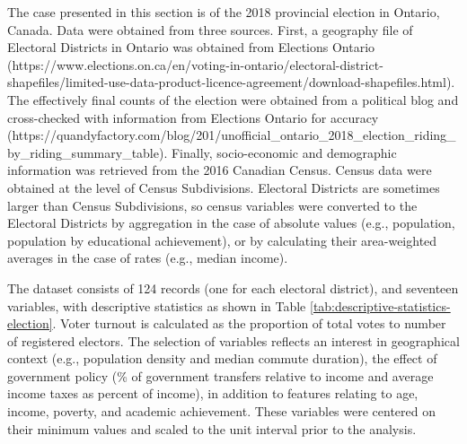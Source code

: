 \documentclass[]{elsarticle} %
\begin{document}
The case presented in this section is of the 2018 provincial election in
Ontario, Canada. Data were obtained from three sources. First, a
geography file of Electoral Districts in Ontario was obtained from
Elections Ontario
(https://www.elections.on.ca/en/voting-in-ontario/electoral-district-shapefiles/limited-use-data-product-licence-agreement/download-shapefiles.html).
The effectively final counts of the election were obtained from a
political blog and cross-checked with information from Elections Ontario
for accuracy
(https://quandyfactory.com/blog/201/unofficial\_ontario\_2018\_election\_riding\_by\_riding\_summary\_table).
Finally, socio-economic and demographic information was retrieved from
the 2016 Canadian Census. Census data were obtained at the level of
Census Subdivisions. Electoral Districts are sometimes larger than
Census Subdivisions, so census variables were converted to the Electoral
Districts by aggregation in the case of absolute values (e.g.,
population, population by educational achievement), or by calculating
their area-weighted averages in the case of rates (e.g., median income).

The dataset consists of 124 records (one for each electoral district),
and seventeen variables, with descriptive statistics as shown in Table
\ref{tab:descriptive-statistics-election}. Voter turnout is calculated
as the proportion of total votes to number of registered electors. The
selection of variables reflects an interest in geographical context
(e.g., population density and median commute duration), the effect of
government policy (\% of government transfers relative to income and
average income taxes as percent of income), in addition to features
relating to age, income, poverty, and academic achievement. These
variables were centered on their minimum values and scaled to the unit
interval prior to the analysis.
\end{document}
